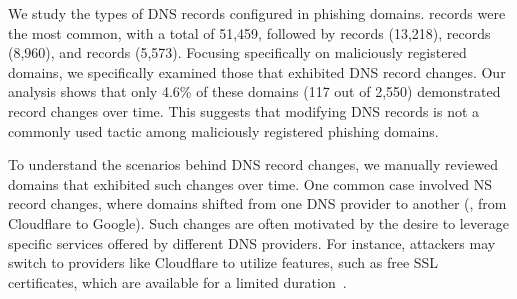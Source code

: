 We study the types of DNS records configured in phishing domains.
 records were the most common, with a total of 51,459, followed by  records (13,218),  records (8,960), and  records (5,573).
Focusing specifically on maliciously registered domains, we specifically examined those that exhibited DNS record changes. 
Our analysis shows that only 4.6\% of these domains (117 out of 2,550) demonstrated record changes over time. 
This suggests that modifying DNS records is not a commonly used tactic among maliciously registered phishing domains.

To understand the scenarios behind DNS record changes, we manually reviewed domains that exhibited such changes over time. 
One common case involved NS record changes, where domains shifted from one DNS provider to another (\eg, from Cloudflare to Google). 
Such changes are often motivated by the desire to leverage specific services offered by different DNS providers. 
For instance, attackers may switch to providers like Cloudflare to utilize features, such as free SSL certificates, which are available for a limited duration~\cite{Cloudfla20:online}.

